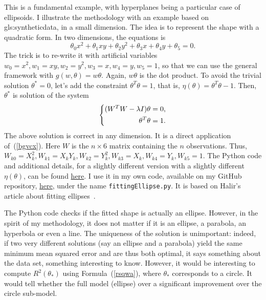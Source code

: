 \documentclass[oneside,10pt]{book}
\begin{document}
This is a fundamental example, with hyperplanes being a particular case of ellipsoids. I illustrate the methodology with an example based on \gls{gls:syntheticdata}, in a small dimension. The idea is to represent the shape with a quadratic form. In two dimensions, the equations is
$$
\theta_0 x^2 + \theta_1 xy + \theta_2 y^2 + \theta_3 x + \theta_4 y + \theta_5=0.
$$
The trick is to re-write it with artificial variables $w_0=x^2, w_1=xy,w_2=y^2, w_3=x,w_4=y,w_5=1$, so that we can use the general framework
 with $g(w,\theta)=w\theta$. Again, $w\theta$ is the dot product. To avoid the trivial solution $\theta^*=0$, let's add the constraint
 $\theta^T\theta=1$, that is, $\eta(\theta)=\theta^T\theta-1$. Then, $\theta^*$ is solution of  the system
\begin{equation}
\centering
\left\{\begin{split}
( W^TW -\lambda I)\theta & =0, \\
 \theta^T\theta & =1. \\
\end{split}\right. \label{bgvcx2} %
\end{equation}
The above solution is correct in any dimension. It is a direct application of~(\ref{bgvcx}). Here $W$ is the $n \times 6$ matrix containing the $n$ observations. Thus, $W_{k0}=X_k^2, W_{k1}=X_kY_k, W_{k2}=Y_k^2,  W_{k3}=X_k, W_{k4}=Y_k, W_{k5}=1$. The Python code and additional details, for a slightly different version with a slightly different $\eta(\theta)$, can be found \href{https://scipython.com/blog/direct-linear-least-squares-fitting-of-an-ellipse/}{here}. I use it in my own code, available on my GitHub repository, \href{https://github.com/VincentGranville/Machine-Learning/blob/main/Source\%20Code/fittingEllipse.py}{here}, under the name \texttt{fittingEllipse.py}.  It is based on Halir's article about fitting ellipses~\cite{Halir98numericallystable}.

The Python code checks if the fitted shape is actually an ellipse. However, in the spirit of my methodology, it does not matter if it is an ellipse, a parabola, an hyperbola or even a line. The uniqueness of the solution is unimportant: indeed, if two very different solutions (say an ellipse and a
 parabola) yield the same minimum mean squared error and are thus both optimal, it says something about the data set,
 something interesting to know.   However, it would be interesting to compute $R^2(\theta_*)$ using
 Formula~(\ref{rsqwa}), where $\theta_*$ corresponds to a circle. It would tell
 whether the full model (ellipse) over a significant improvement over the circle sub-model.
\end{document}
